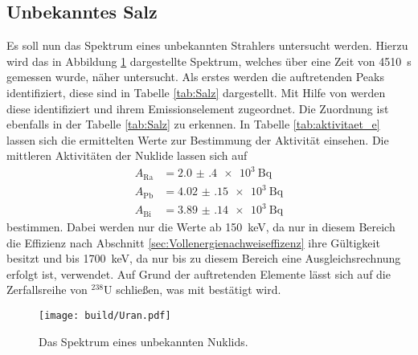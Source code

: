\subsection{Unbekanntes Salz}
\label{sec:Salz}
Es soll nun das Spektrum eines unbekannten Strahlers untersucht werden. Hierzu wird das in Abbildung \ref{fig:Salz}
dargestellte Spektrum, welches über eine Zeit von \SI{4510}{\second} gemessen wurde, näher untersucht.
Als erstes werden die auftretenden Peaks identifiziert, diese sind in Tabelle \ref{tab:Salz} dargestellt.
Mit Hilfe von \cite{referenz1} werden diese identifiziert und ihrem Emissionselement zugeordnet. Die Zuordnung ist
ebenfalls in der Tabelle \ref{tab:Salz} zu erkennen.
In Tabelle \ref{tab:aktivitaet_e} lassen sich die ermittelten Werte zur Bestimmung der Aktivität einsehen.
Die mittleren Aktivitäten der Nuklide lassen sich auf
\begin{align*}
  A_\text{Ra} & = \SI{2.0(4)e3}{\becquerel} \\
  A_\text{Pb} & = \SI{4.02(15)e3}{\becquerel} \\
  A_\text{Bi} & = \SI{3.89(14)e3}{\becquerel}
\end{align*}
bestimmen. Dabei werden nur die Werte ab \SI{150}{\kilo\electronvolt},
da nur in diesem Bereich die Effizienz nach Abschnitt \ref{sec:Vollenergienachweiseffizenz}
ihre Gültigkeit besitzt und bis \SI{1700}{\kilo\electronvolt}, da nur bis zu diesem Bereich 
eine Ausgleichsrechnung erfolgt ist, verwendet.
Auf Grund der auftretenden Elemente lässt sich auf die Zerfallsreihe
von ${}^{238}$U schließen, was mit \cite{referenz1} bestätigt wird.


\begin{figure}[htb]
 \centering
 \texttt{[image: build/Uran.pdf]}
 \caption{Das Spektrum eines unbekannten Nuklids.}
 \label{fig:Salz}
\end{figure}


